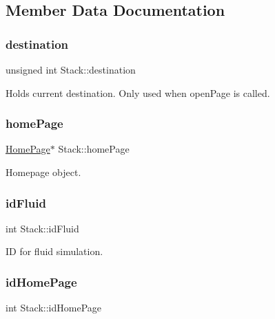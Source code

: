 \subsection{Member Data Documentation}
\mbox{\label{classStack_a1ef23f9e493b0f9d535eb8282114444d}} 
\subsubsection{\texorpdfstring{destination}{destination}}
{\footnotesize\ttfamily unsigned int Stack\+::destination\hspace{0.3cm}{\ttfamily [private]}}



Holds current destination. Only used when open\+Page is called. 

\mbox{\label{classStack_aa1bb5aa087f1766cec2dab2174159194}} 
\subsubsection{\texorpdfstring{homePage}{homePage}}
{\footnotesize\ttfamily \mbox{\hyperlink{classHomePage}{Home\+Page}}$\ast$ Stack\+::home\+Page\hspace{0.3cm}{\ttfamily [private]}}



Homepage object. 

\mbox{\label{classStack_a91b33262d86feccc9a358076b69a0e90}} 
\subsubsection{\texorpdfstring{idFluid}{idFluid}}
{\footnotesize\ttfamily int Stack\+::id\+Fluid\hspace{0.3cm}{\ttfamily [private]}}



ID for fluid simulation. 

\mbox{\label{classStack_a11bccc127cb975dc118f08df920fd48d}} 
\subsubsection{\texorpdfstring{idHomePage}{idHomePage}}
{\footnotesize\ttfamily int Stack\+::id\+Home\+Page\hspace{0.3cm}{\ttfamily [private]}}



